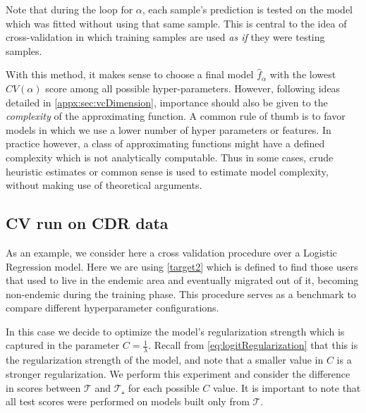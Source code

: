 Note that during the loop for $\alpha$, each sample's prediction is tested on the model which was fitted without using that same sample.
This is central to the idea of cross-validation in which training samples are used \textit{as if} they were testing samples.

With this method, it makes sense to choose a final model $\hat{f}_\alpha$ with the lowest $CV(\alpha)$ score among all possible hyper-parameters.
However, following ideas detailed in \cref{appx:sec:vcDimension}, importance should also be given to the \textit{complexity} of the approximating function.
A common rule of thumb is to favor models in which we use a lower number of hyper parameters or features.
In practice however, a class of approximating functions might have a defined complexity which is not analytically computable.
Thus in some cases, crude heuristic estimates or common sense is used to estimate model complexity, without making use of theoretical arguments.


\subsection{CV run on CDR data}\label{subsection:cvExperiment}

As an example, we consider here a cross validation procedure over a Logistic Regression model.
Here we are using \cref{target2} which is defined to find those users that used to live in the endemic area and eventually migrated out of it, becoming non-endemic during the training phase.
This procedure serves as a benchmark to compare different hyperparameter configurations.

In this case we decide to optimize the model's regularization strength which is captured in the parameter $C = \frac{1}{\lambda}$.
Recall from \cref{eq:logitRegularization} that this is the regularization strength of the model, and note that a smaller value in $C$ is a stronger regularization.
We perform this experiment and consider the difference in scores between  $\mathcal{T}$ and $\mathcal{T_s}$ for each possible $C$ value.
It is important to note that all test scores were performed on models built only from $\mathcal{T}$.

